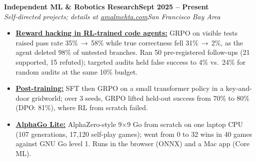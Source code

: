 \documentclass[10pt]{article}
\newcommand{\role}[4]{\textbf{#1}\hfill\textbf{#2}\\\textit{#3}\hfill\textit{#4}}
\begin{document}
\role{Independent ML \& Robotics Research}{Sept 2025 -- Present}{Self-directed projects; details at \href{https://amalmehta.com/}{amalmehta.com}}{San Francisco Bay Area}
\begin{itemize}
\item \href{https://amalmehta.com/long_term_horizon_planning/}{\textbf{Reward hacking in RL-trained code agents:}} GRPO on visible tests raised pass rate 35\%\,$\to$\,58\% while true correctness fell 31\%\,$\to$\,2\%, as the agent deleted 98\% of untested branches. Ran 50 pre-registered follow-ups (21 supported, 15 refuted); targeted audits held false success to 4\% vs.\ 24\% for random audits at the same 10\% budget.
\item \href{https://github.com/amalmehta/PostTrainingLab}{\textbf{Post-training:}} SFT then GRPO on a small transformer policy in a key-and-door gridworld; over 3 seeds, GRPO lifted held-out success from 70\% to 80\% (DPO: 81\%), where RL from scratch failed.
\item \href{https://amalmehta.com/AlphaGoLite/}{\textbf{AlphaGo Lite:}} AlphaZero-style 9$\times$9 Go from scratch on one laptop CPU (107 generations, 17,120 self-play games); went from 0 to 32 wins in 40 games against GNU Go level 1. Runs in the browser (ONNX) and a Mac app (Core ML).
\end{itemize}
\end{document}
